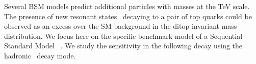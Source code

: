 \subsubsection{}
\label{subsec:topreso:HELHC}



Several BSM models predict additional particles with masses at the TeV scale. The presence of new resonant states~\cite{Harris:2011bh,Boelaert:2009jm,Lee:1973iz,Branco:2011iw,Hill:1994hp,Kaplan:1983sm,Bellazzini:2014yua,Randall:1999ee,Pomarol:1999ad} decaying to a pair of top quarks could be observed as an excess over the SM background in the ditop invariant mass distribution. We focus here on the specific benchmark model of a Sequential Standard Model \ZpSSM~\cite{Langacker:2008yv}.  We study the sensitivity in the following decay using the hadronic \zptt\ decay mode. 

